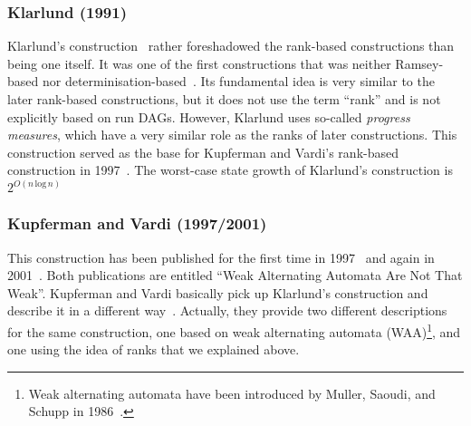 
\subsubsection{Klarlund (1991)}
\label{2_kla91}
Klarlund's construction~\cite{1991_klarlund} rather foreshadowed the rank-based constructions than being one itself. It was one of the first constructions that was neither Ramsey-based nor determinisation-based~\cite{1991_klarlund,Kupferman:2001}. Its fundamental idea is very similar to the later rank-based constructions, but it does not use the term ``rank'' and is not explicitly based on run DAGs. However, Klarlund uses so-called \textit{progress measures}, which have a very similar role as the ranks of later constructions. This construction served as the base for Kupferman and Vardi's rank-based construction in 1997~\cite{1997_vardi}. The worst-case state growth of Klarlund's construction is $2^{O(n\, \text{log}\, n)}$


\subsubsection{Kupferman and Vardi (1997/2001)}
\label{2_kv01}
This construction has been published for the first time in 1997~\cite{1997_vardi} and again in 2001~\cite{Kupferman:2001}. Both publications are entitled ``Weak Alternating Automata Are Not That Weak''. Kupferman and Vardi basically pick up Klarlund's construction and describe it in a different way~\cite{Kupferman:2001}. Actually, they provide two different descriptions for the same construction, one based on weak alternating automata (WAA)\footnote{Weak alternating automata have been introduced by Muller, Saoudi, and Schupp in 1986~\cite{1986_muller}.}, and one using the idea of ranks that we explained above.

